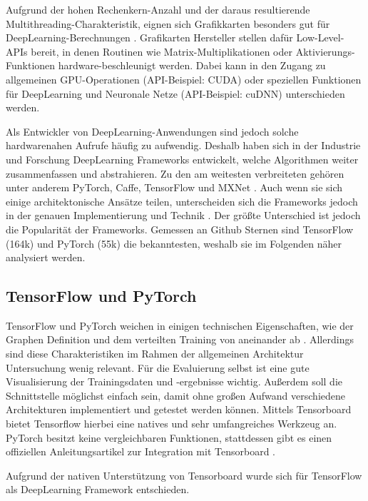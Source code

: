 Aufgrund der hohen Rechenkern-Anzahl und der daraus resultierende Multithreading-Charakteristik, eignen sich Grafikkarten besonders gut für DeepLearning-Berechnungen \cite{gpu-for-dl}.
Grafikarten Hersteller stellen dafür Low-Level-APIs bereit, in denen Routinen wie Matrix-Multiplikationen oder Aktivierungs-Funktionen hardware-beschleunigt werden.
Dabei kann in den Zugang zu allgemeinen GPU-Operationen (API-Beispiel: CUDA) oder speziellen Funktionen für DeepLearning und Neuronale Netze (API-Beispiel: cuDNN) unterschieden werden.
\newline

Als Entwickler von DeepLearning-Anwendungen sind jedoch solche hardwarenahen Aufrufe häufig zu aufwendig.
Deshalb haben sich in der Industrie und Forschung DeepLearning Frameworks entwickelt, welche Algorithmen weiter zusammenfassen und abstrahieren.
Zu den am weitesten verbreiteten gehören unter anderem PyTorch, Caffe, TensorFlow und MXNet \cite{dl-framework-evaluation}. 
Auch wenn sie sich einige architektonische Ansätze teilen, unterscheiden sich die Frameworks jedoch in der genauen Implementierung und Technik \cite{dl-framework-evaluation}.
Der größte Unterschied ist jedoch die Popularität der Frameworks.
Gemessen an Github Sternen sind TensorFlow (164k) \cite{github-tensorflow} und PyTorch (55k) \cite{github-pytorch} die bekanntesten, weshalb sie im Folgenden näher analysiert werden.

\subsection{TensorFlow und PyTorch}
TensorFlow und PyTorch weichen in einigen technischen Eigenschaften, wie der Graphen Definition und dem verteilten Training von aneinander ab \cite{pytorch-vs-tensorflow}.
Allerdings sind diese Charakteristiken im Rahmen der allgemeinen Architektur Untersuchung wenig relevant.
Für die Evaluierung selbst ist eine gute Visualisierung der Trainingsdaten und -ergebnisse wichtig.
Außerdem soll die Schnittstelle möglichst einfach sein, damit ohne großen Aufwand verschiedene Architekturen implementiert und getestet werden können.
Mittels Tensorboard bietet Tensorflow hierbei eine natives und sehr umfangreiches Werkzeug an.
PyTorch besitzt keine vergleichbaren Funktionen, stattdessen gibt es einen offiziellen Anleitungsartikel zur Integration mit Tensorboard \cite{pytorch-tensorboard-offical-documentation}.

Aufgrund der nativen Unterstützung von Tensorboard wurde sich für TensorFlow als DeepLearning Framework entschieden.

